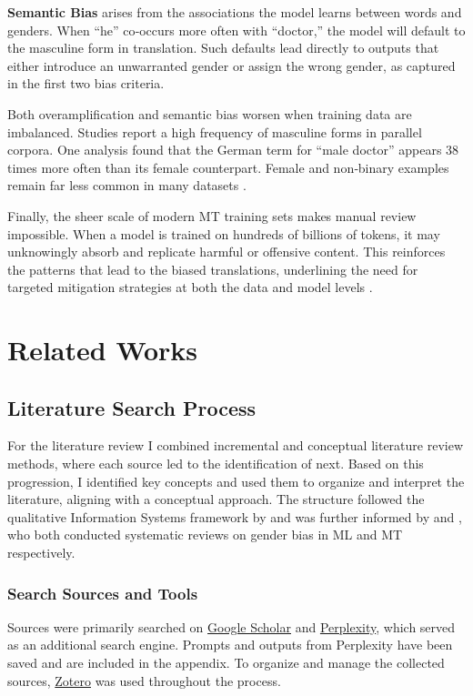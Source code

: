     \textbf{ Semantic Bias} arises from the associations the model learns between words and genders. When “he” co‑occurs more often with “doctor,” the model will default to the masculine form in translation. Such defaults lead directly to outputs that either introduce an unwarranted gender or assign the wrong gender, as captured in the first two bias criteria. 
    
    Both overamplification and semantic bias worsen when training data are imbalanced. Studies report a high frequency of masculine forms in parallel corpora. One analysis found that the German term for “male doctor” appears 38 times more often than its female counterpart. Female and non‑binary examples remain far less common in many datasets \citep{ullmannGenderBiasMachine2022,stanczakSurveyGenderBias2021}.

    Finally, the sheer scale of modern MT training sets makes manual review impossible. When a model is trained on hundreds of billions of tokens, it may unknowingly absorb and replicate harmful or offensive content. This reinforces the patterns that lead to the biased translations, underlining the need for targeted mitigation strategies at both the data and model levels \citep{ullmannGenderBiasMachine2022}.


\section{Related Works}

\subsection{Literature Search Process}
    For the literature review I combined incremental and conceptual literature review methods, where each source led to the identification of next. Based on this progression, I identified key concepts and used them to organize and interpret the literature, aligning with a conceptual approach. The structure followed the qualitative Information Systems framework by \citet{schryenWritingQualitativeLiterature2015} and was further informed by \citet{shresthaExploringGenderBiases2022} and \citet{savoldiDecadeGenderBias2025}, who both conducted systematic reviews on gender bias in ML and MT respectively. 

    \subsubsection{Search Sources and Tools}
    Sources were primarily searched on \href{https://scholar.google.com/}{Google Scholar} and \href{https://www.perplexity.ai/}{Perplexity}, which served as an additional search engine. Prompts and outputs from Perplexity have been saved and are included in the appendix. To organize and manage the collected sources, \href{https://www.zotero.org/}{Zotero} was used throughout the process.

